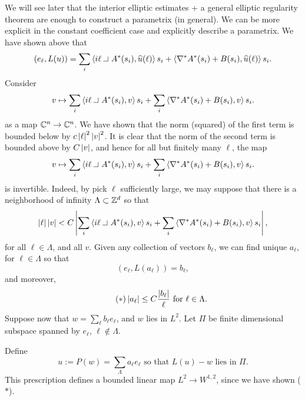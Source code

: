   We will see later that the interior elliptic estimates + a general elliptic regularity theorem are enough to construct a parametrix (in general). We can be more explicit in the constant coefficient case and explicitly describe a parametrix. We have shown above that
  \begin{equation*}
    (e_{\ell},L(u))=\sum_{i}\ip{i\ell\intprod A^{*}(s_{i}),\hat{u}(\ell)}s_{i}+\ip{\nabla^{*}A^{*}(s_{i})+B(s_{i}),\hat{u}(\ell)}s_{i}.
  \end{equation*}
  Consider
  \begin{equation*}
    v\mapsto \sum_{i}\ip{i\ell\intprod A^{*}(s_{i}),v}s_{i}+\sum_{i}\ip{\nabla^{*}A^{*}(s_{i})+B(s_{i}),v}s_{i}.
  \end{equation*}
  as a map $\mathbb{C}^{n}\to \mathbb{C}^{n}$. We have shown that the norm (squared) of the first term is bounded below by $c\left|\ell\right|^{2}\left|v\right|^{2}$. It is clear that the norm of the second term is bounded above by $C\left|v\right|$, and hence for all but finitely many $\ell$, the map
  \begin{equation*}
    v\mapsto \sum_{i}\ip{i\ell\intprod A^{*}(s_{i}),v}s_{i}+\sum_{i}\ip{\nabla^{*}A^{*}(s_{i})+B(s_{i}),v}s_{i}.
  \end{equation*}
  is invertible. Indeed, by pick $\ell$ sufficiently large, we may suppose that there is a neighborhood of infinity $\Lambda\subset \mathbb{Z}^{d}$ so that
  \begin{equation*} 
    \abs{\ell}\abs{v}<C\abs{\sum_{i}\ip{i\ell\intprod A^{*}(s_{i}),v}s_{i}+\sum_{i}\ip{\nabla^{*}A^{*}(s_{i})+B(s_{i}),v}s_{i}},
  \end{equation*}
  for all $\ell\in \Lambda$, and all $v$. Given any collection of vectors $b_{\ell}$, we can find unique $a_{\ell}$, for $\ell\in \Lambda$ so that
  \begin{equation*}
    (e_{\ell},L(a_{\ell}))=b_{\ell},
  \end{equation*}
  and moreover,
  \begin{equation*}\tag{$\ast$}
    \left|a_{\ell}\right|\le C\frac{\left|b_{\ell}\right|}{\ell}\text{ for $\ell\in \Lambda$}.
  \end{equation*}
  Suppose now that $w=\sum_{\ell}b_{\ell}e_{\ell}$, and $w$ lies in $L^{2}$. Let $\Pi$ be finite dimensional subspace spanned by $e_{\ell}$, $\ell\not\in \Lambda$.

  Define
  \begin{equation*}
    u:=P(w)=\sum_{\Lambda}a_{\ell}e_{\ell}\text{ so that }L(u)-w\text{ lies in $\Pi$}.
  \end{equation*}
  This prescription defines a bounded linear map $L^{2}\to W^{1,2}$, since we have shown ($\ast$).

